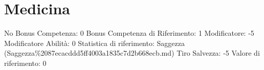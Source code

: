 \section{Medicina}\label{medicina}

\begin{description}
\tightlist
\item[Tags: ABI]
No Bonus Competenza: 0 Bonus Competenza di Riferimento: 1 Modificatore:
-5 Modificatore Abilità: 0 Statistica di riferimento: Saggezza
(Saggezza\%2087ecacddd5ff4003a1835c7d2b668ecb.md) Tiro Salvezza: -5
Valore di riferimento: 0
\end{description}
